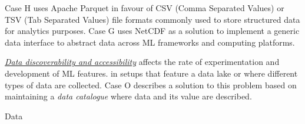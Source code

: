\DIFdelend \DIFaddbegin {}\DIFaddend Case H uses Apache Parquet in favour of CSV (Comma Separated Values) or TSV (Tab Separated Values) file formats commonly used to store structured data for analytics purposes. Case G uses NetCDF as a solution to implement a generic data interface to abstract data across ML frameworks and computing platforms.
\DIFdelbegin {}\DIFdelend 


\underline{\emph{Data discoverability and accessibility}}
affects the rate of experimentation and development of ML features. \DIFdelbegin {}\DIFdelend \DIFaddbegin \DIFadd{\textcolor{green}{Moreso} }\DIFaddend in setups that feature a data lake or where different types of data are collected. Case O describes a solution to this problem based on maintaining a \textit{data catalogue} where data and its value are described. %

Data \DIFdelbegin {}\DIFdelend \DIFaddbegin {}\DIFaddend %


